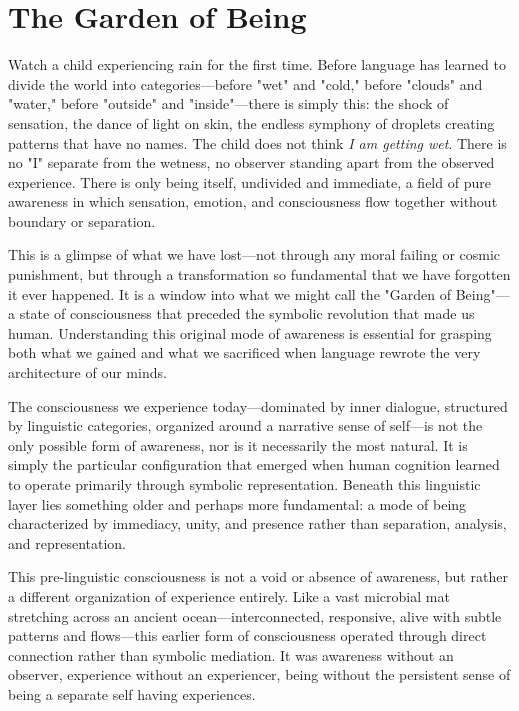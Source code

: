 \chapter{The Garden of Being}

Watch a child experiencing rain for the first time. Before language has learned to divide the world into categories—before "wet" and "cold," before "clouds" and "water," before "outside" and "inside"—there is simply this: the shock of sensation, the dance of light on skin, the endless symphony of droplets creating patterns that have no names. The child does not think \textit{I am getting wet}. There is no "I" separate from the wetness, no observer standing apart from the observed experience. There is only being itself, undivided and immediate, a field of pure awareness in which sensation, emotion, and consciousness flow together without boundary or separation.

This is a glimpse of what we have lost—not through any moral failing or cosmic punishment, but through a transformation so fundamental that we have forgotten it ever happened. It is a window into what we might call the "Garden of Being"—a state of consciousness that preceded the symbolic revolution that made us human. Understanding this original mode of awareness is essential for grasping both what we gained and what we sacrificed when language rewrote the very architecture of our minds.

The consciousness we experience today—dominated by inner dialogue, structured by linguistic categories, organized around a narrative sense of self—is not the only possible form of awareness, nor is it necessarily the most natural. It is simply the particular configuration that emerged when human cognition learned to operate primarily through symbolic representation. Beneath this linguistic layer lies something older and perhaps more fundamental: a mode of being characterized by immediacy, unity, and presence rather than separation, analysis, and representation.

This pre-linguistic consciousness is not a void or absence of awareness, but rather a different organization of experience entirely. Like a vast microbial mat stretching across an ancient ocean—interconnected, responsive, alive with subtle patterns and flows—this earlier form of consciousness operated through direct connection rather than symbolic mediation. It was awareness without an observer, experience without an experiencer, being without the persistent sense of being a separate self having experiences.

